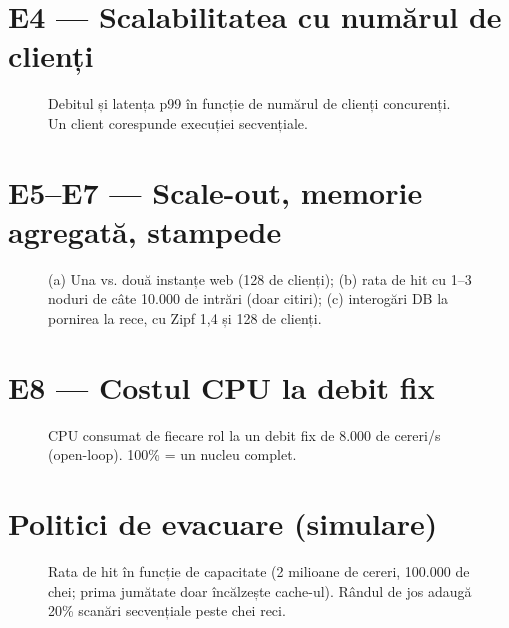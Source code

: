 

\section{E4 — Scalabilitatea cu numărul de clienți}

\begin{figure}[H]
  \centering
  \caption{Debitul și latența p99 în funcție de numărul de clienți concurenți. Un client corespunde
           execuției secvențiale.}
  \label{fig:e4}
\end{figure}



\section{E5–E7 — Scale-out, memorie agregată, stampede}

\begin{figure}[H]
  \centering\resizebox{\linewidth}{!}{}
  \caption{(a) Una vs. două instanțe web (128 de clienți); (b) rata de hit cu 1–3 noduri de câte 10.000
           de intrări (doar citiri); (c) interogări DB la pornirea la rece, cu Zipf 1,4 și 128 de clienți.}
  \label{fig:e567}
\end{figure}



\section{E8 — Costul CPU la debit fix}

\begin{figure}[H]
  \centering
  \caption{CPU consumat de fiecare rol la un debit fix de 8.000 de cereri/s (open-loop). 100\% = un
           nucleu complet.}
  \label{fig:e8}
\end{figure}



\section{Politici de evacuare (simulare)}
\label{sec:sim}

\begin{figure}[H]
  \centering
  \caption{Rata de hit în funcție de capacitate (2 milioane de cereri, 100.000 de chei; prima jumătate
           doar încălzește cache-ul). Rândul de jos adaugă 20\% scanări secvențiale peste chei reci.}
  \label{fig:sim}
\end{figure}


